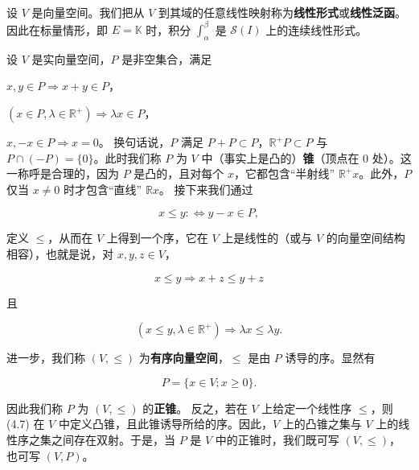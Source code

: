 \begin{remark}

\begin{items}
\item

设 $ V $ 是向量空间。我们把从 $ V $ 到其域的任意线性映射称为\textbf{线性形式}或\textbf{线性泛函}。
因此在标量情形，即 $ E = \mathbb{K} $ 时，积分 $ \int_{\alpha}^{\beta} $ 是 $ \mathcal{S}(I) $ 上的连续线性形式。

\item

设 $ V $ 是实向量空间，$ P $ 是非空集合，满足

\begin{subitems}
\item

$ x, y \in P \Rightarrow x + y \in P $，

\item

$ (x \in P, \lambda \in \mathbb{R}^{+}) \Rightarrow \lambda x \in P $，

\item

$ x, -x \in P \Rightarrow x = 0 $。
换句话说，$ P $ 满足 $ P + P \subset P $，$ \mathbb{R}^{+}P \subset P $ 与 $ P \cap (-P) = \{0\} $。此时我们称 $ P $ 为 $ V $ 中（事实上是凸的）\textbf{锥}（顶点在 0 处）。这一称呼是合理的，因为 $ P $ 是凸的，且对每个 $ x $，它都包含“半射线” $ \mathbb{R}^{+}x $。此外，$ P $ 仅当 $ x \ne 0 $ 时才包含“直线” $ \mathbb{R}x $。
接下来我们通过

\begin{equation}
x \le y :\Leftrightarrow y - x \in P ,\tag{4.6}
\end{equation}

定义 $ \le $，从而在 $ V $ 上得到一个序，它在 $ V $ 上是线性的（或与 $ V $ 的向量空间结构相容），也就是说，对 $ x, y, z \in V $，

\[
x \le y \Rightarrow x + z \le y + z
\]

且

\[
(x \le y, \lambda \in \mathbb{R}^{+}) \Rightarrow \lambda x \le \lambda y .
\]

进一步，我们称 $ (V, \le) $ 为\textbf{有序向量空间}，$ \le $ 是由 $ P $ 诱导的序。显然有

\begin{equation}
P = \{x \in V ; x \ge 0\} .\tag{4.7}
\end{equation}

因此我们称 $ P $ 为 $ (V, \le) $ 的\textbf{正锥}。
反之，若在 $ V $ 上给定一个线性序 $ \le $，则 (4.7) 在 $ V $ 中定义凸锥，且此锥诱导所给的序。因此，$ V $ 上的凸锥之集与 $ V $ 上的线性序之集之间存在双射。于是，当 $ P $ 是 $ V $ 中的正锥时，我们既可写 $ (V, \le) $，也可写 $ (V, P) $。


\end{subitems}
\end{items}
\end{remark}
